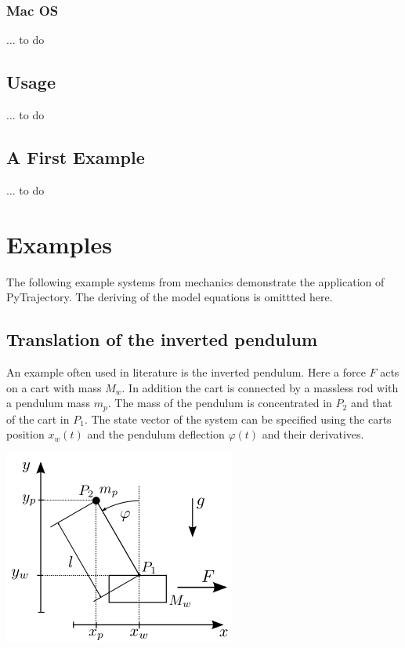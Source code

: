 \documentclass[letterpaper,10pt,english]{sphinxmanual}
\begin{document}
\subsubsection{Mac OS}
\label{guide/start:mac-os}
... to do


\subsection{Usage}
\label{guide/start:usage}
... to do


\subsection{A First Example}
\label{guide/start:a-first-example}
... to do


\section{Examples}
\label{guide/examples/index::doc}\label{guide/examples/index:examples}
The following example systems from mechanics demonstrate the application
of PyTrajectory. The deriving of the model equations is omittted here.


\subsection{Translation of the inverted pendulum}
\label{guide/examples/inv_pendulum_trans::doc}\label{guide/examples/inv_pendulum_trans:translation-of-the-inverted-pendulum}
An example often used in literature is the inverted pendulum. Here a
force \(F\) acts on a cart with mass \(M_w\). In addition the
cart is connected by a massless rod with a pendulum mass \(m_p\).
The mass of the pendulum is concentrated in \(P_2\) and that of the
cart in \(P_1\). The state vector of the system can be specified
using the carts position \(x_w(t)\) and the pendulum deflection
\(\varphi(t)\) and their derivatives.

\includegraphics{inv_pendulum.png}
\end{document}
